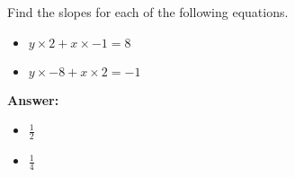  Find the slopes for each of the following equations. \begin{itemize}\item \( y \times 2 + x \times -1 = 8 \)\item \( y \times -8 + x \times 2 = -1 \)\end{itemize}

        \textbf{Answer:} \begin{itemize}\item \( \frac{1}{2} \)\item \( \frac{1}{4} \)\end{itemize}
